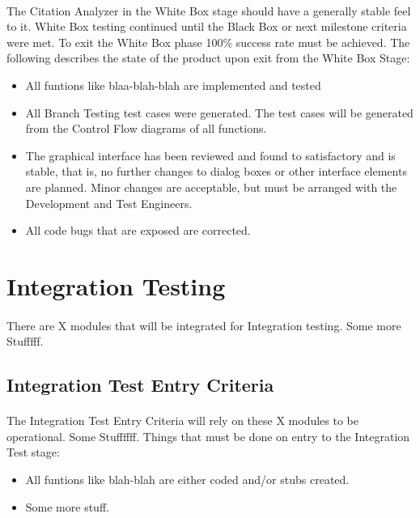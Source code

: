 \documentclass[a4paper,10pt]{scrreprt}
\begin{document}
\paragraph{}
The Citation Analyzer in the White Box stage should have a generally stable feel to it. White Box testing continued until the Black Box or next milestone criteria were met. To exit the White Box phase 100\% success rate must be achieved. The following describes the state of the product upon exit from the White Box Stage:
\begin{itemize}
	\item All funtions like blaa-blah-blah are implemented and tested
	\item All Branch Testing test cases were generated. The test cases will be generated from the Control Flow diagrams of all functions.
	\item The graphical interface has been reviewed and found to satisfactory and is stable, that is, no further changes to dialog boxes or other interface elements are planned. Minor changes are acceptable, but must be arranged with the Development and Test Engineers.
	\item All code bugs that are exposed are corrected.
\end{itemize}
\section{Integration Testing}
\paragraph{}
There are X modules that will be integrated for Integration testing. Some more Stufffff.
\subsection{Integration Test Entry Criteria}
\paragraph{}
The Integration Test Entry Criteria will rely on these X modules to be operational. 
Some Stuffffff.
Things that must be done on entry to the Integration Test stage:
\begin{itemize}
	\item All funtions like blah-blah are either coded and/or stubs created.
	\item Some more stuff.
\end{itemize}
\paragraph{}
\end{document}
